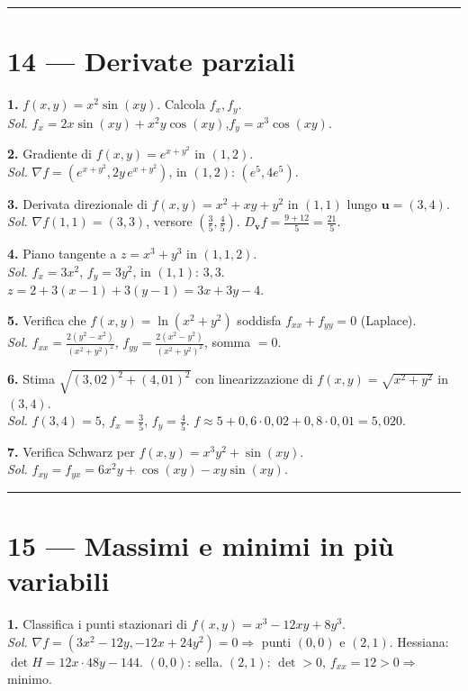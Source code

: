 \documentclass[11pt,a4paper]{article}
\begin{document}
\medskip\hrule\medskip

\section*{14 — Derivate parziali}

\textbf{1.} $f(x,y)=x^2\sin(xy)$. Calcola $f_x,f_y$.\\
\emph{Sol.} $f_x=2x\sin(xy)+x^2 y\cos(xy)$,\quad $f_y=x^3\cos(xy)$.

\textbf{2.} Gradiente di $f(x,y)=e^{x+y^2}$ in $(1,2)$.\\
\emph{Sol.} $\nabla f=(e^{x+y^2},2y\,e^{x+y^2})$, in $(1,2)$: $(e^5, 4e^5)$.

\textbf{3.} Derivata direzionale di $f(x,y)=x^2+xy+y^2$ in $(1,1)$ lungo $\mathbf u=(3,4)$.\\
\emph{Sol.} $\nabla f(1,1)=(3,3)$, versore $(\tfrac{3}{5},\tfrac{4}{5})$. $D_{\mathbf v}f=\tfrac{9+12}{5}=\tfrac{21}{5}$.

\textbf{4.} Piano tangente a $z=x^3+y^3$ in $(1,1,2)$.\\
\emph{Sol.} $f_x=3x^2,\,f_y=3y^2$, in $(1,1)$: $3,3$. $z=2+3(x-1)+3(y-1)=3x+3y-4$.

\textbf{5.} Verifica che $f(x,y)=\ln(x^2+y^2)$ soddisfa $f_{xx}+f_{yy}=0$ (Laplace).\\
\emph{Sol.} $f_{xx}=\tfrac{2(y^2-x^2)}{(x^2+y^2)^2}$, $f_{yy}=\tfrac{2(x^2-y^2)}{(x^2+y^2)^2}$, somma $=0$.

\textbf{6.} Stima $\sqrt{(3{,}02)^2+(4{,}01)^2}$ con linearizzazione di $f(x,y)=\sqrt{x^2+y^2}$ in $(3,4)$.\\
\emph{Sol.} $f(3,4)=5$, $f_x=\tfrac{3}{5}$, $f_y=\tfrac{4}{5}$. $f\approx 5+0{,}6\cdot 0{,}02+0{,}8\cdot 0{,}01=5{,}020$.

\textbf{7.} Verifica Schwarz per $f(x,y)=x^3 y^2 + \sin(xy)$.\\
\emph{Sol.} $f_{xy}=f_{yx}=6x^2 y+\cos(xy)-xy\sin(xy)$.

\medskip\hrule\medskip

\section*{15 — Massimi e minimi in più variabili}

\textbf{1.} Classifica i punti stazionari di $f(x,y)=x^3-12xy+8y^3$.\\
\emph{Sol.} $\nabla f=(3x^2-12y,-12x+24y^2)=0\Rightarrow$ punti $(0,0)$ e $(2,1)$. Hessiana: $\det H=12x\cdot 48 y-144$. $(0,0)$: sella. $(2,1)$: $\det>0$, $f_{xx}=12>0\Rightarrow$ minimo.
\end{document}

